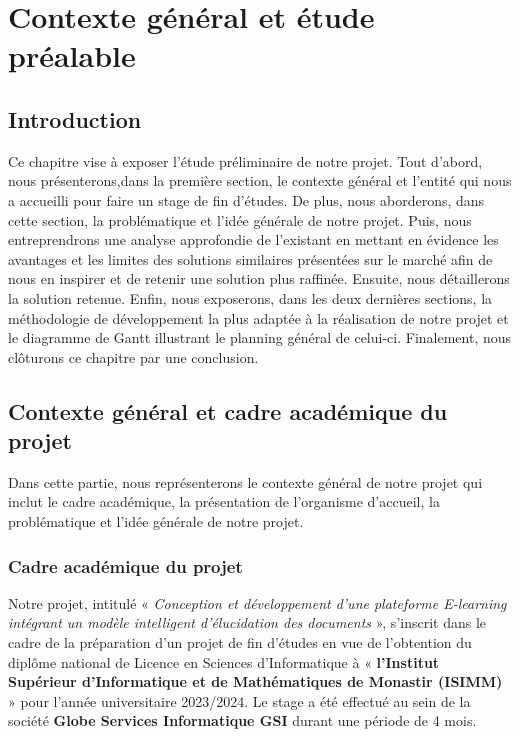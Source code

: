 \vfill 
\chapter{Contexte général et étude préalable}
\label{chap:etude-preliminaire}
\vfill 
\minitoc
\mtcaddchapter
\vfill 

\newpage 

\section*{Introduction}
\justifying
Ce chapitre vise à exposer l'étude préliminaire de notre projet. Tout d’abord, nous présenterons,dans la première section, le contexte général et l’entité qui nous a accueilli pour faire un stage de fin d'études. De plus, nous aborderons, dans cette section, la problématique et l'idée générale de notre projet. Puis, nous entreprendrons une analyse approfondie de l'existant en mettant en évidence les avantages et les limites des solutions similaires présentées sur le marché afin de nous en inspirer et de retenir une solution plus raffinée. Ensuite, nous détaillerons la solution retenue. Enfin, nous exposerons, dans les deux dernières sections, la méthodologie de développement la plus adaptée à la réalisation de notre projet et le diagramme de Gantt illustrant le planning général de celui-ci. Finalement, nous clôturons ce chapitre par une conclusion.
\section{Contexte général et cadre académique du projet}
\justifying
Dans cette partie, nous représenterons le contexte général de notre projet qui inclut le cadre académique, la présentation de l’organisme d’accueil, la problématique et l’idée générale de notre projet.

\subsection{Cadre académique du projet}
Notre projet, intitulé « \textit{Conception et développement d’une plateforme E-learning intégrant un modèle intelligent d’élucidation des documents} », s’inscrit dans le cadre de la préparation d’un projet de fin d’études en vue de l’obtention du diplôme national de Licence en Sciences d’Informatique à  « \textbf{l’Institut Supérieur d’Informatique et de Mathématiques de Monastir (ISIMM)} » pour l’année universitaire 2023/2024. Le stage a été effectué au sein de la société \textbf{Globe Services Informatique GSI} durant une période de 4 mois.

